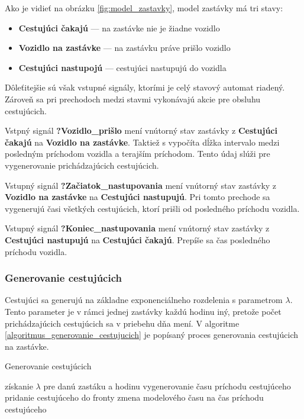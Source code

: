 Ako je vidieť na obrázku \ref{fig:model_zastavky}, model zastávky má tri stavy:
\begin{itemize}
  \item \textbf{Cestujúci čakajú} --- na zastávke nie je žiadne vozidlo
  \item \textbf{Vozidlo na zastávke} --- na zastávku práve prišlo vozidlo
  \item \textbf{Cestujúci nastupojú} --- cestujúci nastupujú do vozidla
\end{itemize}

Dôleťitejšie sú však vstupné signály, ktorími je celý stavový automat riadený.
Zároveň sa pri prechodoch medzi stavmi vykonávajú akcie pre obsluhu cestujúcich.

Vstpný signál \textbf{?Vozidlo\_prišlo} mení vnútorný stav zastávky z \textbf{Cestujúci čakajú} na \textbf{Vozidlo na zastávke}.
Taktiež s vypočíta dĺžka intervalo medzi posledným príchodom vozidla a terajším príchodom.
Tento údaj slúži pre vygenerovanie prichádzajúcich cestujúcich.

Vstupný signál \textbf{?Začiatok\_nastupovania} mení vnútorný stav zastávky z \textbf{Vozidlo na zastávke} na \textbf{Cestujúci nastupujú}.
Pri tomto prechode sa vygenerujú časi všetkých cestujúcich, ktorí prišli od posledného príchodu vozidla.

Vstupný signál \textbf{?Koniec\_nastupovania} mení vnútorný stav zastávky z \textbf{Cestujúci nastupujú} na \textbf{Cestujúci čakajú}.
Prepíše sa čas posledného príchodu vozidla.

\subsubsection{Generovanie cestujúcich}

Cestujúci sa generujú na základne exponenciálneho rozdelenia s parametrom $\lambda$.
Tento parameter je v rámci jednej zastávky každú hodinu iný, pretože počet prichádzajúcich cestujúcich sa v priebehu dňa mení.
V algoritme \ref{algoritmus_generovanie_cestujucich} je popísaný proces generovania cestujúcich na zastávke.

\vspace*{\dimexpr 0.5\baselineskip\relax}
\begin{algorithm}[H]
\label{algoritmus_generovanie_cestujucich}
\caption{Generovanie cestujúcich}
  získanie $\lambda$ pre danú zastáku a hodinu\;
   {
    vygenerovanie času príchodu cestujúceho\;
    pridanie cestujúceho do fronty\;
    zmena modelového času na čas príchodu cestujúceho\;
  }
\end{algorithm}

